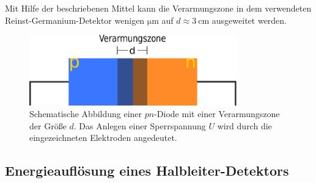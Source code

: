 Mit Hilfe der beschriebenen Mittel kann die Verarmungszone in dem verwendeten
Reinst-Germanium-Detektor wenigen $\si{\micro\meter}$ auf
$d\approx\SI{3}{\centi\meter}$ ausgeweitet werden.
\begin{figure}
  \centering
  \includegraphics[width=0.8\textwidth]{Pics/pndiode.pdf}
  \caption{Schematische Abbildung einer $pn$-Diode mit einer Verarmungszone der Größe $d$.
  Das Anlegen einer Sperrspannung $U$ wird durch die eingezeichneten Elektroden angedeutet.}
  \label{fig:pndiode}
\end{figure}
\FloatBarrier
\subsection{Energieauflösung eines Halbleiter-Detektors}
\label{subsec:energieauflösung}

